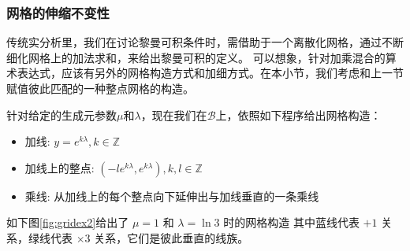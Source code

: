 \documentclass[a4paper,12pt]{article}
\numberwithin{problem}{section}
\numberwithin{definition}{section}
\numberwithin{lemma}{section}
\numberwithin{proposition}{section}
\numberwithin{theorem}{section}
\numberwithin{grammar}{section}
\numberwithin{program}{section}
\numberwithin{convention}{section}
\numberwithin{corollary}{section}
\begin{document}
\subsubsection{网格的伸缩不变性}
\label{sec:grid-scaling-invariance}

传统实分析里，我们在讨论黎曼可积条件时，需借助于一个离散化网格，通过不断细化网格上的加法求和，来给出黎曼可积的定义。
可以想象，针对加乘混合的算术表达式，应该有另外的网格构造方式和加细方式。在本小节，我们考虑和上一节赋值彼此匹配的一种整点网格的构造。

针对给定的生成元参数$\mu$和$\lambda$，现在我们在$\mathcal{B}$上，依照如下程序给出网格构造：
\begin{itemize}
    \item 加线: $y = e^{k\lambda}, k \in \mathbb{Z}$
    \item 加线上的整点: $(- l e^{k\lambda} , e^{k\lambda}), k, l \in \mathbb{Z}$
    \item 乘线: 从加线上的每个整点向下延伸出与加线垂直的一条乘线
\end{itemize}

如下图\ref{fig:gridex2}给出了 $\mu = 1$ 和 $\lambda = \ln 3$ 时的网格构造
其中蓝线代表 $+ 1$ 关系，绿线代表 $\times 3$ 关系，它们是彼此垂直的线族。
\end{document}

